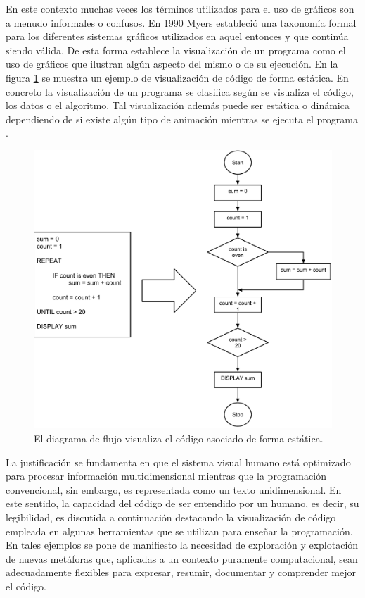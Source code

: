 \documentclass{llncs}
\begin{document}
En este contexto muchas veces los términos utilizados para el uso de gráficos son a menudo informales o confusos. En 1990 Myers \cite{myers1990taxonomies} estableció una taxonomía formal para los diferentes sistemas gráficos utilizados en aquel entonces y que continúa siendo válida. De esta forma establece la visualización de un programa como el uso de gráficos que ilustran algún aspecto del mismo o de su ejecución. En la figura \ref{fig:flowchart} se muestra un ejemplo de visualización de código de forma estática. En concreto la visualización de un programa se clasifica según se visualiza el código, los datos o el algoritmo. Tal visualización además puede ser estática o dinámica dependiendo de si existe algún tipo de animación mientras se ejecuta el programa \cite{urquiza2009survey}. 

\begin{figure}[ht]
\begin{center}
\includegraphics[scale=0.45]{images/flowchart2.pdf}
\caption{El diagrama de flujo visualiza el código asociado de forma estática.
\label{fig:flowchart}}
\end{center}
\end{figure}

La justificación se fundamenta en que el sistema visual humano está optimizado para procesar información multidimensional mientras que la programación convencional, sin embargo, es representada como un texto unidimensional. En este sentido, la capacidad del código de ser entendido por un humano, es decir, su legibilidad, es discutida a continuación destacando la visualización de código empleada en algunas herramientas que se utilizan para enseñar la programación. En tales ejemplos se pone de manifiesto la necesidad de exploración y explotación de nuevas metáforas que, aplicadas a un contexto puramente computacional, sean adecuadamente flexibles para expresar, resumir, documentar y comprender mejor el código. 
\end{document}
